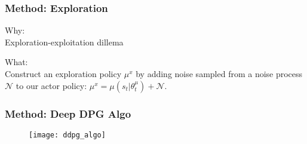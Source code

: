 \begin{frame}
\frametitle{Method: Exploration}
Why:\\
Exploration-exploitation dillema
\vspace{5mm}

What:\\
Construct an exploration policy $\mu^x$ by adding noise sampled from
a noise process $\mathcal{N}$ to our actor policy:
$\mu^x = \mu(s_t | \theta^{\mu}_t) + \mathcal{N}$.

\end{frame}

\begin{frame}
\frametitle{Method: Deep DPG Algo}
\begin{figure}
    \centering
    \texttt{[image: ddpg\_algo]}
\end{figure}
\end{frame}
